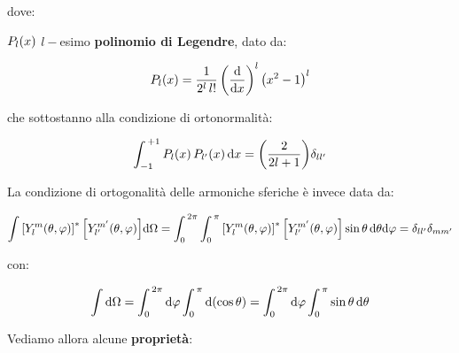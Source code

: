 	dove:
	
\begin{nb}

	$P_l\qty(x)$ $l-$esimo \textbf{polinomio di Legendre}, dato da:
	
\begin{align*}
	P_l \qty(x) = \frac{1}{2^l \, l!} \, \qty(\dv{}{x})^l \, \qty(x^2 - 1)^l
\end{align*}

\end{nb}

	che sottostanno alla condizione di ortonormalità:
	
\begin{align*}
	\int_{-1}^{ \, +1} P_l \qty(x) \, P_{l'}\qty(x) \, \dd x = \qty(\frac{2}{2l +1}) \delta_{ll'}
\end{align*}

	La condizione di ortogonalità delle armoniche sferiche è invece data da:
	
\begin{align*}
	\int \qty[Y_l^m \qty(\theta, \varphi)]^* \, \qty[Y_{l'}^{m'} \qty(\theta, \varphi)] \dd \Omega = \int_0^{\, 2\pi} \int_0^{\, \pi} \qty[Y_l^m \qty(\theta, \varphi)]^* \, \qty[Y_{l'}^{m'} \qty(\theta, \varphi)] \sin\theta \, \dd \theta \dd \varphi = \delta_{l l'}\delta_{m m'}
\end{align*}

	con:
	
\begin{align*}
	\int \dd \Omega = \int_0^{\, 2\pi} \dd \varphi \int_0^{\, \pi} \dd \qty(\cos\theta) = \int_0^{\, 2\pi} \dd \varphi \int_0^{\, \pi} \sin\theta \, \dd \theta
\end{align*}

	Vediamo allora alcune \textbf{proprietà}:
	
